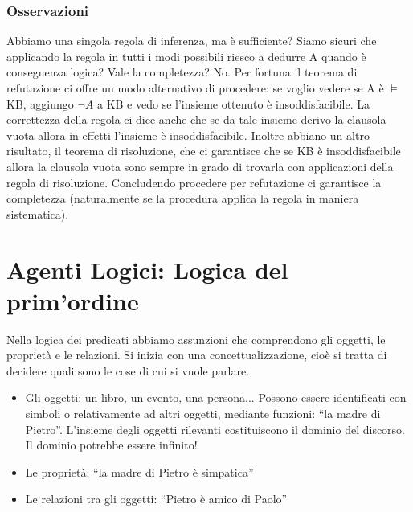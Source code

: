 \documentclass{article}
\begin{document}
\subsubsection{Osservazioni}
Abbiamo una singola regola di inferenza, ma è sufficiente? Siamo sicuri che applicando la regola in tutti i modi possibili riesco a dedurre A quando è conseguenza logica? Vale la completezza? No. 
Per fortuna il teorema di refutazione ci offre un modo alternativo di procedere: se voglio vedere se A è $\models$ KB, aggiungo $\neg A$ a KB e vedo se l’insieme ottenuto è insoddisfacibile. La correttezza della regola ci dice anche che se da tale insieme derivo la clausola vuota allora in effetti l’insieme è insoddisfacibile. Inoltre abbiano un altro risultato, il teorema di risoluzione, che ci garantisce che se KB è insoddisfacibile allora la clausola vuota sono sempre in grado di trovarla con applicazioni della regola di risoluzione. Concludendo procedere per refutazione ci garantisce la completezza (naturalmente se la procedura applica la regola in maniera sistematica).

\section{Agenti Logici: Logica del prim'ordine}
Nella logica dei predicati abbiamo assunzioni che comprendono gli oggetti, le proprietà e le relazioni. Si inizia con una concettualizzazione, cioè si tratta di decidere quali sono le cose di cui si vuole parlare. 
\begin{itemize}
    \item Gli oggetti: un libro, un evento, una persona... Possono essere identificati con simboli o relativamente ad altri oggetti, mediante funzioni: “la madre di Pietro”. L’insieme degli oggetti rilevanti costituiscono il dominio del discorso. Il dominio potrebbe essere infinito! 
    \item Le proprietà: “la madre di Pietro è simpatica”
    \item Le relazioni tra gli oggetti: “Pietro è amico di Paolo”
\end{itemize} 
\end{document}
